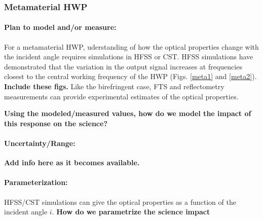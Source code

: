 \subsubsection{Metamaterial HWP}

\paragraph{Plan to model and/or measure:}
For a metamaterial HWP, uderstanding of how the optical properties change with the incident angle requires simulations in HFSS or CST. HFSS simulations have demonstrated that the variation in the output signal increases at frequencies closest to the central working frequency of the
HWP (Figs. \ref{meta1} and \ref{meta2}). \textbf{Include these figs.}
Like the birefringent case, FTS and reflectometry measurements can provide experimental estimates of the optical properties.

\textbf{Using the modeled/measured values, how do we model the impact of this response on the science?}

\paragraph{Uncertainty/Range:}
\textbf{Add info here as it becomes available.}

\paragraph{Parameterization:}
HFSS/CST simulations can give the optical properties as a function of the incident angle $i$. \textbf{How do we parametrize the science impact}


